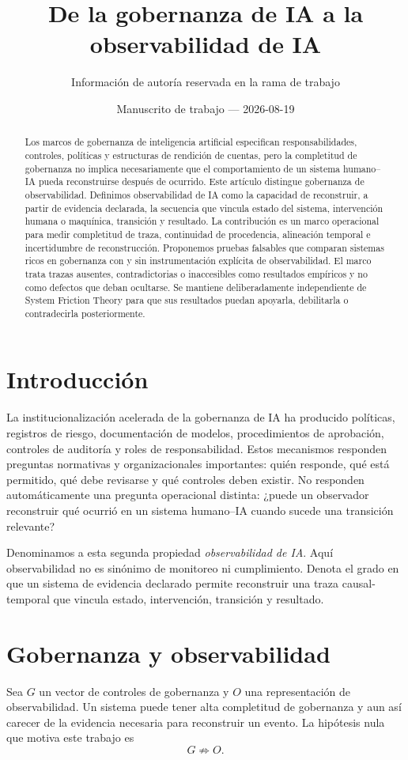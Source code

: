 \documentclass[11pt]{article}
\title{De la gobernanza de IA a la observabilidad de IA}
\author{Información de autoría reservada en la rama de trabajo}
\date{Manuscrito de trabajo --- 2026-08-19}
\begin{document}
\maketitle

\begin{abstract}
Los marcos de gobernanza de inteligencia artificial especifican responsabilidades, controles, políticas y estructuras de rendición de cuentas, pero la completitud de gobernanza no implica necesariamente que el comportamiento de un sistema humano--IA pueda reconstruirse después de ocurrido. Este artículo distingue gobernanza de observabilidad. Definimos observabilidad de IA como la capacidad de reconstruir, a partir de evidencia declarada, la secuencia que vincula estado del sistema, intervención humana o maquínica, transición y resultado. La contribución es un marco operacional para medir completitud de traza, continuidad de procedencia, alineación temporal e incertidumbre de reconstrucción. Proponemos pruebas falsables que comparan sistemas ricos en gobernanza con y sin instrumentación explícita de observabilidad. El marco trata trazas ausentes, contradictorias o inaccesibles como resultados empíricos y no como defectos que deban ocultarse. Se mantiene deliberadamente independiente de System Friction Theory para que sus resultados puedan apoyarla, debilitarla o contradecirla posteriormente.
\end{abstract}

\section{Introducción}
La institucionalización acelerada de la gobernanza de IA ha producido políticas, registros de riesgo, documentación de modelos, procedimientos de aprobación, controles de auditoría y roles de responsabilidad. Estos mecanismos responden preguntas normativas y organizacionales importantes: quién responde, qué está permitido, qué debe revisarse y qué controles deben existir. No responden automáticamente una pregunta operacional distinta: ¿puede un observador reconstruir qué ocurrió en un sistema humano--IA cuando sucede una transición relevante?

Denominamos a esta segunda propiedad \emph{observabilidad de IA}. Aquí observabilidad no es sinónimo de monitoreo ni cumplimiento. Denota el grado en que un sistema de evidencia declarado permite reconstruir una traza causal-temporal que vincula estado, intervención, transición y resultado.

\section{Gobernanza y observabilidad}
Sea $G$ un vector de controles de gobernanza y $O$ una representación de observabilidad. Un sistema puede tener alta completitud de gobernanza y aun así carecer de la evidencia necesaria para reconstruir un evento. La hipótesis nula que motiva este trabajo es
\[
G \not\Rightarrow O.
\]
\end{document}

